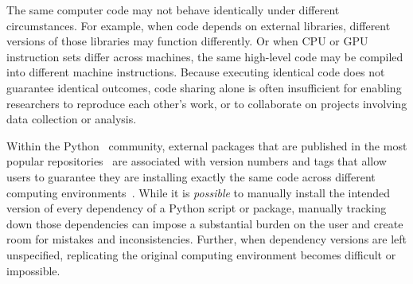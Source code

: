 \documentclass[preprint,12pt,a4paper]{elsarticle}
\begin{document}
The same computer code may not behave identically under different
circumstances.  For example, when code depends on external libraries,
different versions of those libraries may function differently.  Or
when CPU or GPU instruction sets differ across machines, the same
high-level code may be compiled into different machine instructions.
Because executing identical code does not guarantee identical
outcomes, code sharing alone is often insufficient for
enabling researchers to reproduce each other's work, or to collaborate on
projects involving data collection or analysis.

Within the Python~\cite{vanR95} community, external
packages that are published in the most popular
repositories~\cite{Pyth03, cond15} are associated with version numbers
and tags that allow users to guarantee they are installing
exactly the same code across different computing environments~\cite{CoghStuf13}.
While it is \textit{possible} to manually install the intended
version of every dependency of a Python script or package, manually
tracking down those dependencies can impose a substantial burden on
the user and create room for mistakes and inconsistencies. Further, when dependency versions
are left unspecified, replicating the original computing environment
becomes difficult or impossible.
\end{document}
